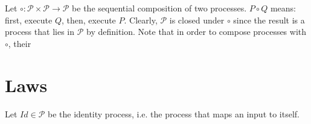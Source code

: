 Let $\circ \colon \mathcal{P} \times \mathcal{P} \to \mathcal{P}$ be the sequential composition of two processes. $P \circ Q$ means: first, execute $Q$, then, execute $P$. Clearly, $\mathcal{P}$ is closed under $\circ$ since the result is a process that lies in $\mathcal{P}$ by definition. Note that in order to compose processes with $\circ$, their 

\section{Laws}
Let $Id \in \mathcal{P}$ be the identity process, i.e. the process that maps an input to itself.